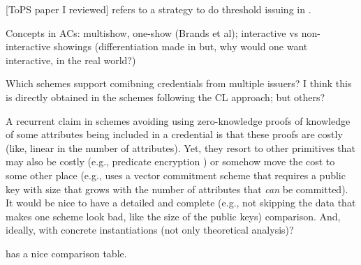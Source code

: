 [ToPS paper I reviewed] refers to a strategy to do threshold issuing in \cite{bbh06}.

Concepts in ACs: multishow, one-show (Brands et al); interactive vs non-interactive
showings (differentiation made in \cite[p.6]{fhs19} but, why would one want interactive,
in the real world?)

Which schemes support comibning credentials from multiple issuers? I think this
is directly obtained in the schemes following the CL approach; but others?

A recurrent claim in schemes avoiding using zero-knowledge proofs of knowledge
of some attributes being included in a credential is that these proofs are costly
(like, linear in the number of attributes). Yet, they resort to other primitives
that may also be costly (e.g., predicate encryption \cite{dmm+18}) or somehow move
the cost to some other place (e.g., \cite{fhs19} uses a vector commitment scheme
that requires a public key with size that grows with the number of attributes
that \emph{can} be committed). It would be nice to have a detailed and complete
(e.g., not skipping the data that makes one scheme look bad, like the size of
the public keys) comparison. And, ideally, with concrete instantiations (not only
theoretical analysis)?

\cite{fhs19} has a nice comparison table.



